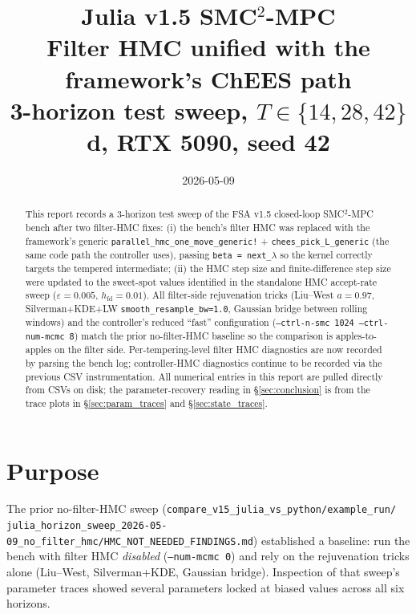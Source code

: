 \documentclass[11pt,a4paper]{article}
\title{Julia v1.5 SMC$^2$-MPC \\
       Filter HMC unified with the framework's ChEES path \\
       \large 3-horizon test sweep, $T \in \{14, 28, 42\}$ d, RTX 5090, seed 42}
\author{}
\date{2026-05-09}
\begin{document}
\maketitle

\begin{abstract}
This report records a 3-horizon test sweep of the FSA v1.5 closed-loop
SMC$^2$-MPC bench after two filter-HMC fixes: (i) the bench's filter
HMC was replaced with the framework's generic
\texttt{parallel\_hmc\_one\_move\_generic!} +
\texttt{chees\_pick\_L\_generic} (the same code path the controller
uses), passing \texttt{beta = next\_$\lambda$} so the kernel correctly
targets the tempered intermediate; (ii) the HMC step size and
finite-difference step size were updated to the sweet-spot values
identified in the standalone HMC accept-rate sweep
($\varepsilon = 0.005$, $h_{\mathrm{fd}} = 0.01$). All filter-side
rejuvenation tricks (Liu--West $a=0.97$, Silverman+KDE+LW
\texttt{smooth\_resample\_bw=1.0}, Gaussian bridge between rolling
windows) and the controller's reduced ``fast'' configuration
(\texttt{--ctrl-n-smc 1024 --ctrl-num-mcmc 8}) match the prior
no-filter-HMC baseline so the comparison is apples-to-apples on the
filter side. Per-tempering-level filter HMC diagnostics are now
recorded by parsing the bench log; controller-HMC diagnostics
continue to be recorded via the previous CSV instrumentation. All
numerical entries in this report are pulled directly from CSVs on
disk; the parameter-recovery reading in
\S\ref{sec:conclusion} is from the trace plots in
\S\ref{sec:param_traces} and \S\ref{sec:state_traces}.
\end{abstract}

\tableofcontents
\clearpage


\section{Purpose}
\label{sec:purpose}

The prior no-filter-HMC sweep
(\texttt{compare\_v15\_julia\_vs\_python/example\_run/}\\
\texttt{julia\_horizon\_sweep\_2026-05-09\_no\_filter\_hmc/HMC\_NOT\_NEEDED\_FINDINGS.md})
established a baseline: run the bench with filter HMC \emph{disabled}
(\texttt{--num-mcmc 0}) and rely on the rejuvenation tricks alone
(Liu--West, Silverman+KDE, Gaussian bridge). Inspection of that
sweep's parameter traces showed several parameters locked at biased
values across all six horizons.
\end{document}

